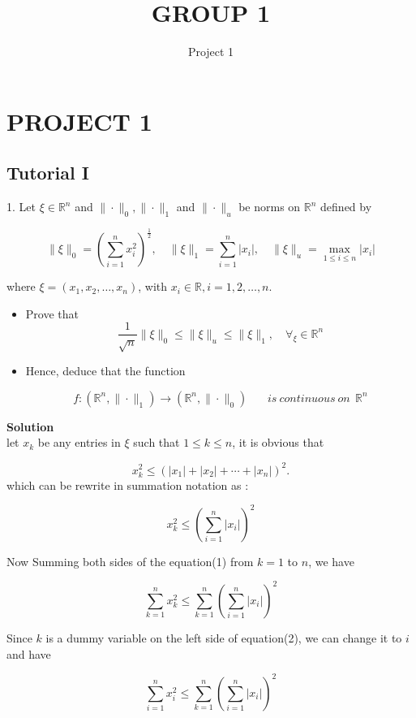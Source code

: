 \documentclass{article}
\title{GROUP 1}
\author{Project 1}
\begin{document}
\section{PROJECT 1}
\subsection{Tutorial I}
\large{}
1. Let $\xi \in \mathbb{R}^{n}$ and $\|\cdot\|_{0},\|\cdot\|_{1}$ and $\|\cdot\|_{u}$ be norms on $\mathbb{R}^{n}$ defined by

$$
\|\xi\|_{0}=\left(\sum_{i=1}^{n} x_{i}^{2}\right)^{\frac{1}{2}}, \quad\|\xi\|_{1}=\sum_{i=1}^{n}\left|x_{i}\right|, \quad\|\xi\|_{u}=\max _{1 \leq i \leq n}\left|x_{i}\right|
$$

where $\xi=\left(x_{1}, x_{2}, \ldots, x_{n}\right)$, with $x_{i} \in \mathbb{R}, i=1,2, \ldots, n$.
\begin{itemize}
    \item Prove that
$$
\frac{1}{\sqrt{n}}\|\xi\|_{0} \leq\|\xi\|_{u} \leq\|\xi\|_{1}, \quad \forall_{\xi} \in \mathbb{R}^{n}
$$
\item Hence, deduce that the function

$$
f:\left(\mathbb{R}^{n},\|\cdot\|_{1}\right) \longrightarrow\left(\mathbb{R}^{n},\|\cdot\|_{0}\right)~~~~~~~~is ~continuous~ on ~~\mathbb{R}^{n}
$$
\end{itemize}

\textbf{Solution}\\

let $x_k$ be any entries in $\xi$ such that $1 \leq k \leq n$, it is obvious that

$$
x_{k}^{2} \leq\left(\left|x_{1}\right|+\left|x_{2}\right|+\cdots+\left|x_{n}\right|\right)^{2} .
$$
which can be rewrite in summation notation as :

$$\begin{equation}
x_{k}^{2} \leq \left(\sum_{i=1}^{n}\left|x_{i}\right|\right)^{2}
\end{equation}$$

Now Summing both sides of the equation(1) from $k=1$ to $n$, we have

$$\begin{equation}
\sum_{k=1}^{n} x_{k}^{2} \leq \sum_{k=1}^{n}\left(\sum_{i=1}^{n}\left|x_{i}\right|\right)^{2}
\end{equation}$$

Since $k$ is a dummy variable on the left side of equation(2), we can change it to $i$ and have

$$
\sum_{i=1}^{n} x_{i}^{2} \leq \sum_{k=1}^{n}\left(\sum_{i=1}^{n}\left|x_{i}\right|\right)^{2}
$$
\end{document}
